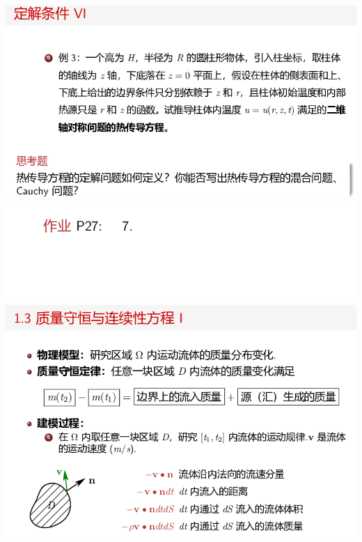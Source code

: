 \documentclass[11pt,a4paper]{ctexart}
\begin{document}
\begin{paracol}{2}
\includegraphics[width=\linewidth]{chap01_39.png}
\includegraphics[width=\linewidth]{chap01_40.png}
\includegraphics[width=\linewidth]{chap01_41.png}


\end{paracol}
\end{document}
